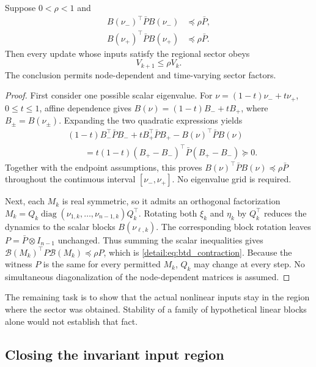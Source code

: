\begin{btdlemma}
\label{detail:lem:btd_endpoint}
Suppose $0<\rho<1$ and
\begin{align}
 B(\nu_-)^\top\bar P B(\nu_-)&\preceq\rho\bar P,\nonumber\\
 B(\nu_+)^\top\bar P B(\nu_+)&\preceq\rho\bar P.
 \label{detail:eq:btd_d_endpoints}
\end{align}
Then every update whose inputs satisfy the regional sector obeys
\begin{equation}
 V_{k+1}\le\rho V_k.
 \label{detail:eq:btd_contraction}
\end{equation}
The conclusion permits node-dependent and time-varying sector factors.
\end{btdlemma}
\begin{proof}
First consider one possible scalar eigenvalue. For
$\nu=(1-t)\nu_-+t\nu_+$, $0\le t\le1$, affine dependence gives
$B(\nu)=(1-t)B_-+tB_+$, where $B_\pm=B(\nu_\pm)$.
Expanding the two quadratic expressions yields
\begin{align}
 &(1-t)B_-^\top\bar P B_-+tB_+^\top\bar P B_+
       -B(\nu)^\top\bar P B(\nu)\nonumber\\
 &\qquad=t(1-t)(B_+-B_-)^\top\bar P(B_+-B_-)\succeq0.
 \label{detail:eq:btd_d_convexity}
\end{align}
Together with the endpoint assumptions, this proves
$B(\nu)^\top\bar P B(\nu)\preceq\rho\bar P$ throughout the
continuous interval $[\nu_-,\nu_+]$. No eigenvalue grid is required.

Next, each $M_k$ is real symmetric, so it admits an orthogonal
factorization $M_k=Q_k\operatorname{diag}(\nu_{1,k},\ldots,
\nu_{n-1,k})Q_k^\top$. Rotating both $\xi_k$ and $\eta_k$ by $Q_k^\top$
reduces the dynamics to the scalar blocks $B(\nu_{\ell,k})$.
The corresponding block rotation leaves $P=\bar P\otimes I_{n-1}$
unchanged. Thus summing the scalar inequalities gives
$\mathcal B(M_k)^\top P\mathcal B(M_k)\preceq\rho P$, which is
\eqref{detail:eq:btd_contraction}. Because the witness $P$ is the same for
every permitted $M_k$, $Q_k$ may change at every step. No simultaneous
diagonalization of the node-dependent matrices is assumed.
\end{proof}

The remaining task is to show that the actual nonlinear inputs stay in
the region where the sector was obtained. Stability of a family of
hypothetical linear blocks alone would not establish that fact.

\subsection{Closing the invariant input region}

